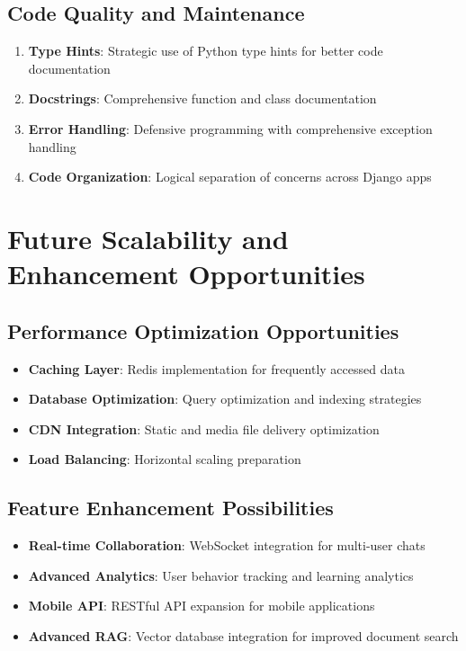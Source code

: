 \documentclass[12pt,a4paper]{article}
\begin{document}
\subsection{Code Quality and Maintenance}

\begin{enumerate}
    \item \textbf{Type Hints}: Strategic use of Python type hints for better code documentation
    \item \textbf{Docstrings}: Comprehensive function and class documentation
    \item \textbf{Error Handling}: Defensive programming with comprehensive exception handling
    \item \textbf{Code Organization}: Logical separation of concerns across Django apps
\end{enumerate}

\section{Future Scalability and Enhancement Opportunities}

\subsection{Performance Optimization Opportunities}

\begin{itemize}
    \item \textbf{Caching Layer}: Redis implementation for frequently accessed data
    \item \textbf{Database Optimization}: Query optimization and indexing strategies
    \item \textbf{CDN Integration}: Static and media file delivery optimization
    \item \textbf{Load Balancing}: Horizontal scaling preparation
\end{itemize}

\subsection{Feature Enhancement Possibilities}

\begin{itemize}
    \item \textbf{Real-time Collaboration}: WebSocket integration for multi-user chats
    \item \textbf{Advanced Analytics}: User behavior tracking and learning analytics
    \item \textbf{Mobile API}: RESTful API expansion for mobile applications
    \item \textbf{Advanced RAG}: Vector database integration for improved document search
\end{itemize}
\end{document}
